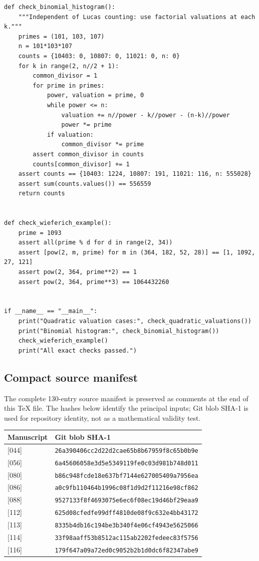 \documentclass[11pt,a4paper]{article}
\theoremstyle{definition}
\theoremstyle{remark}
\numberwithin{equation}{section}
\begin{document}
\begin{lstlisting}
def check_binomial_histogram():
    """Independent of Lucas counting: use factorial valuations at each k."""
    primes = (101, 103, 107)
    n = 101*103*107
    counts = {10403: 0, 10807: 0, 11021: 0, n: 0}
    for k in range(2, n//2 + 1):
        common_divisor = 1
        for prime in primes:
            power, valuation = prime, 0
            while power <= n:
                valuation += n//power - k//power - (n-k)//power
                power *= prime
            if valuation:
                common_divisor *= prime
        assert common_divisor in counts
        counts[common_divisor] += 1
    assert counts == {10403: 1224, 10807: 191, 11021: 116, n: 555028}
    assert sum(counts.values()) == 556559
    return counts


def check_wieferich_example():
    prime = 1093
    assert all(prime % d for d in range(2, 34))
    assert [pow(2, m, prime) for m in (364, 182, 52, 28)] == [1, 1092, 27, 121]
    assert pow(2, 364, prime**2) == 1
    assert pow(2, 364, prime**3) == 1064432260


if __name__ == "__main__":
    print("Quadratic valuation cases:", check_quadratic_valuations())
    print("Binomial histogram:", check_binomial_histogram())
    check_wieferich_example()
    print("All exact checks passed.")
\end{lstlisting}

\subsection{Compact source manifest}

The complete 130-entry source manifest is preserved as comments at
the end of this TeX file. The hashes below identify the principal
inputs; Git blob SHA-1 is used for repository identity, not as a
mathematical validity test.

\begin{center}
\small
\begin{tabular}{@{}ll@{}}
\toprule
Manuscript & Git blob SHA-1\\
\midrule
{[044]} & \texttt{26a390406cc2d22d2cae65b8b67959f8c65b0b9e}\\
{[056]} & \texttt{6a45606058e3d5e5349119fe0c03d981b748d011}\\
{[080]} & \texttt{b86c948fcde18e637bf7144e627005409a7956ea}\\
{[086]} & \texttt{a0c9fb110464b1996c08f1d9d2f11216e98cf862}\\
{[088]} & \texttt{9527133f8f4693075e6ec6f08ec19d46bf29eaa9}\\
{[112]} & \texttt{625d08cfedfe99dff4810de08f9c632e4bb43172}\\
{[113]} & \texttt{8335b4db16c194be3b340f4e06cf4943e5625066}\\
{[114]} & \texttt{33f98aaff53b8512ac115ab2202fedeec83f5756}\\
{[116]} & \texttt{179f647a09a72ed0c9052b2b1d0dc6f82347abe9}\\
\bottomrule
\end{tabular}
\end{center}
\end{document}
